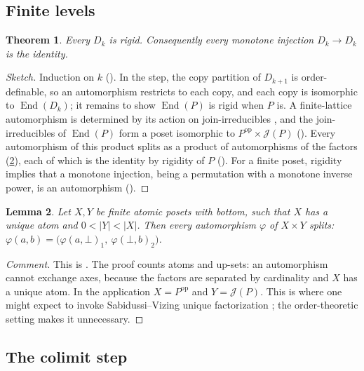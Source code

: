 \documentclass[11pt]{amsart}
\theoremstyle{plain}
\newtheorem{theorem}{Theorem}[section]
\newtheorem{lemma}[theorem]{Lemma}
\theoremstyle{definition}
\newcommand{\End}{\operatorname{End}}
\newcommand{\J}{\mathcal{J}}
\begin{document}
\subsection{Finite levels}

\begin{theorem}\label{thm:finite}
Every $D_k$ is rigid. Consequently every monotone injection $D_k\to D_k$ is the
identity.
\end{theorem}

\begin{proof}[Sketch]
Induction on $k$ (). In the step, the
copy partition of $D_{k+1}$ is order-definable, so an automorphism restricts to
each copy, and each copy is isomorphic to $\End(D_k)$; it remains to show
$\End(P)$ is rigid when $P$ is. A finite-lattice automorphism is determined by
its action on join-irreducibles \cite{DaveyPriestley2002}, and the
join-irreducibles of $\End(P)$ form a poset isomorphic to
$P^{\mathrm{op}}\times\J(P)$ (). Every
automorphism of this product splits as a product of automorphisms of the
factors (\cref{lem:prodaut}), each of which is the identity by rigidity of $P$
(). For a finite poset, rigidity implies that a
monotone injection, being a permutation with a monotone inverse power, is an
automorphism ().
\end{proof}

\begin{lemma}\label{lem:prodaut}
Let $X,Y$ be finite atomic posets with bottom, such that $X$ has a unique atom
and $0<|Y|<|X|$. Then every automorphism $\varphi$ of $X\times Y$ splits:
$\varphi(a,b)=\bigl(\varphi(a,\bot)_1,\ \varphi(\bot,b)_2\bigr)$.
\end{lemma}

\begin{proof}[Comment]
This is . The proof counts atoms and up-sets: an automorphism cannot
exchange axes, because the factors are separated by cardinality and $X$ has a
unique atom. In the application $X=P^{\mathrm{op}}$ and $Y=\J(P)$. This is where
one might expect to invoke Sabidussi--Vizing unique factorization
\cite{Sabidussi1960,Vizing1963}; the order-theoretic setting makes it
unnecessary.
\end{proof}

\subsection{The colimit step}
\end{document}
